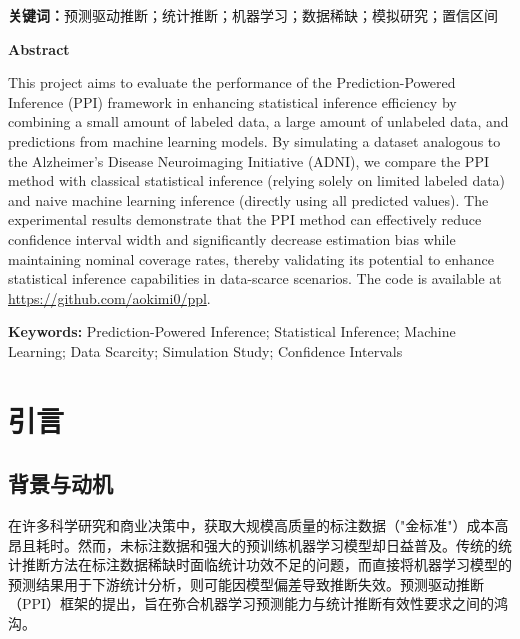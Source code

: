 \documentclass[12pt,a4paper]{article}
\begin{document}
\vspace{1em}
\noindent\textbf{关键词：}预测驱动推断；统计推断；机器学习；数据稀缺；模拟研究；置信区间

\clearpage
{}
{}
\begin{center}
    {\bfseries Abstract}
\end{center}
\vspace{0.5em}
\small
\setlength{\parindent}{2em}

\indent This project aims to evaluate the performance of the Prediction-Powered Inference (PPI) framework in enhancing statistical inference efficiency by combining a small amount of labeled data, a large amount of unlabeled data, and predictions from machine learning models. By simulating a dataset analogous to the Alzheimer's Disease Neuroimaging Initiative (ADNI), we compare the PPI method with classical statistical inference (relying solely on limited labeled data) and naive machine learning inference (directly using all predicted values). The experimental results demonstrate that the PPI method can effectively reduce confidence interval width and significantly decrease estimation bias while maintaining nominal coverage rates, thereby validating its potential to enhance statistical inference capabilities in data-scarce scenarios. The code is available at \url{https://github.com/aokimi0/ppl}.

\vspace{1em}
\noindent\textbf{Keywords:} Prediction-Powered Inference; Statistical Inference; Machine Learning; Data Scarcity; Simulation Study; Confidence Intervals

\clearpage
\tableofcontents
\clearpage

\section{引言}
\subsection{背景与动机}
\indent 在许多科学研究和商业决策中，获取大规模高质量的标注数据（"金标准"）成本高昂且耗时。然而，未标注数据和强大的预训练机器学习模型却日益普及。传统的统计推断方法在标注数据稀缺时面临统计功效不足的问题，而直接将机器学习模型的预测结果用于下游统计分析，则可能因模型偏差导致推断失效。预测驱动推断（PPI）框架的提出，旨在弥合机器学习预测能力与统计推断有效性要求之间的鸿沟。
\end{document}

